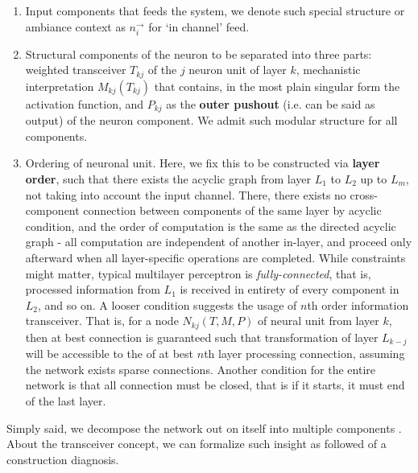 \begin{enumerate}[topsep=1pt,itemsep=1pt]
    \item Input components that feeds the system, we denote such special structure or ambiance context as $n_{i}^{\to}$ for `in channel' feed. 
    \item Structural components of the neuron to be separated into three parts: weighted transceiver $T_{kj}$ of the $j$ neuron unit of layer $k$, mechanistic interpretation $M_{kj}(T_{kj})$ that contains, in the most plain singular form the activation function, and $P_{kj}$ as the \textbf{outer pushout} (i.e. can be said as output) of the neuron component. We admit such modular structure for all components. 
    \item Ordering of neuronal unit. Here, we fix this to be constructed via \textbf{layer order}, such that there exists the acyclic  graph from layer $L_{1}$ to $L_{2}$ up to $L_{m}$, not taking into account the input channel. There, there exists no cross-component connection between components of the same layer by acyclic  condition, and the order of computation is the same as the directed acyclic  graph - all computation are independent of another in-layer, and proceed only afterward when all layer-specific operations are completed. While constraints might matter, typical multilayer perceptron is \textit{fully-connected}, that is, processed information from $L_{1}$ is received in entirety of every component in $L_{2}$, and so on. A looser condition suggests the usage of $n$th order information transceiver. That is, for a node $N_{kj}(T,M,P)$ of neural unit from layer $k$, then at best connection is guaranteed such that transformation of layer $L_{k-j}$ will be accessible to the of at best $n$th layer processing connection, assuming the network exists sparse connections. Another condition for the entire network is that all connection must be closed, that is if it starts, it must end of the last layer. 
\end{enumerate}
Simply said, we decompose the network out on itself into multiple components . About the transceiver concept, we can formalize such insight as followed of a construction diagnosis. 
